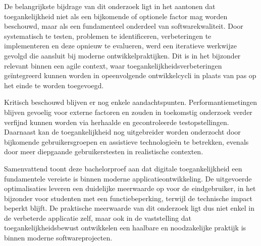 De belangrijkste bijdrage van dit onderzoek ligt in het aantonen dat toegankelijkheid niet als een bijkomende of optionele factor mag worden beschouwd, maar als een fundamenteel onderdeel van softwarekwaliteit. Door systematisch te testen, problemen te identificeren, verbeteringen te implementeren en deze opnieuw te evalueren, werd een iteratieve werkwijze gevolgd die aansluit bij moderne ontwikkelpraktijken. Dit is in het bijzonder relevant binnen een agile context, waar toegankelijkheidsverbeteringen geïntegreerd kunnen worden in opeenvolgende ontwikkelcycli in plaats van pas op het einde te worden toegevoegd.

Kritisch beschouwd blijven er nog enkele aandachtspunten. Performantiemetingen blijven gevoelig voor externe factoren en zouden in toekomstig onderzoek verder verfijnd kunnen worden via herhaalde en gecontroleerde testopstellingen. Daarnaast kan de toegankelijkheid nog uitgebreider worden onderzocht door bijkomende gebruikersgroepen en assistieve technologieën te betrekken, evenals door meer diepgaande gebruikerstesten in realistische contexten.

Samenvattend toont deze bachelorproef aan dat digitale toegankelijkheid een fundamentele vereiste is binnen moderne applicatieontwikkeling. De uitgevoerde optimalisaties leveren een duidelijke meerwaarde op voor de eindgebruiker, in het bijzonder voor studenten met een functiebeperking, terwijl de technische impact beperkt blijft. De praktische meerwaarde van dit onderzoek ligt dus niet enkel in de verbeterde applicatie zelf, maar ook in de vaststelling dat toegankelijkheidsbewust ontwikkelen een haalbare en noodzakelijke praktijk is binnen moderne softwareprojecten.


